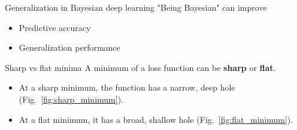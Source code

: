 \documentclass{beamer}
\begin{document}
\begin{frame}{Generalization in Bayesian deep learning}
    "Being Bayesian" can improve
    \begin{itemize}
        \item Predictive accuracy
        \item Generalization performance
    \end{itemize}
\end{frame}

\begin{frame}{Sharp vs flat minima}
    A minimum of a loss function can be \textbf{sharp} or \textbf{flat}.
    \begin{itemize}
        \item At a sharp minimum, the function has a narrow, deep hole (Fig.~\ref{fig:sharp_minimum}).
        \item At a flat minimum, it has a broad, shallow hole (Fig.~\ref{fig:flat_minimum}).
    \end{itemize}
    

\end{frame}
\end{document}
